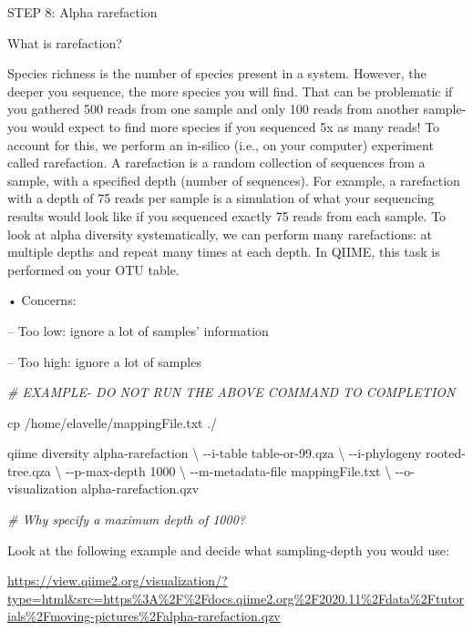 \documentclass[
]{book}
\newenvironment{Shaded}{\begin{snugshade}}{\end{snugshade}}
\newcommand{\CommentTok}[1]{\textcolor[rgb]{0.56,0.35,0.01}{\textit{#1}}}
\newcommand{\DataTypeTok}[1]{\textcolor[rgb]{0.13,0.29,0.53}{#1}}
\newcommand{\ExtensionTok}[1]{#1}
\newcommand{\FunctionTok}[1]{\textcolor[rgb]{0.00,0.00,0.00}{#1}}
\newcommand{\NormalTok}[1]{#1}
\begin{document}
STEP 8: Alpha rarefaction

What is rarefaction?

Species richness is the number of species present in a system. However, the deeper you sequence, the more species you will find. That can be problematic if you gathered 500 reads from one sample and only 100 reads from another sample- you would expect to find more species if you sequenced 5x as many reads! To account for this, we perform an in-silico (i.e., on your computer) experiment called rarefaction. A rarefaction is a random collection of sequences from a sample, with a specified depth (number of sequences). For example, a rarefaction with a depth of 75 reads per sample is a simulation of what your sequencing results would look like if you sequenced exactly 75 reads from each sample. To look at alpha diversity systematically, we can perform many rarefactions: at multiple depths and repeat many times at each depth. In QIIME, this task is performed on your OTU table.

• Concerns:

-- Too low: ignore a lot of samples' information

-- Too high: ignore a lot of samples

\begin{Shaded}
\begin{Highlighting}[]

\CommentTok{\# EXAMPLE{-} DO NOT RUN THE ABOVE COMMAND TO COMPLETION}

\FunctionTok{cp}\NormalTok{ /home/elavelle/mappingFile.txt ./}

\ExtensionTok{qiime}\NormalTok{ diversity alpha{-}rarefaction }\DataTypeTok{\textbackslash{}}
\NormalTok{{-}{-}i{-}table table{-}or{-}99.qza }\DataTypeTok{\textbackslash{}}
\NormalTok{{-}{-}i{-}phylogeny rooted{-}tree.qza }\DataTypeTok{\textbackslash{}}
\NormalTok{{-}{-}p{-}max{-}depth 1000 }\DataTypeTok{\textbackslash{}}
\NormalTok{{-}{-}m{-}metadata{-}file mappingFile.txt }\DataTypeTok{\textbackslash{}}
\NormalTok{{-}{-}o{-}visualization alpha{-}rarefaction.qzv}

\CommentTok{\# Why specify a maximum depth of 1000?}
\end{Highlighting}
\end{Shaded}

Look at the following example and decide what sampling-depth you would use:

\url{https://view.qiime2.org/visualization/?type=html\&src=https\%3A\%2F\%2Fdocs.qiime2.org\%2F2020.11\%2Fdata\%2Ftutorials\%2Fmoving-pictures\%2Falpha-rarefaction.qzv}
\end{document}
